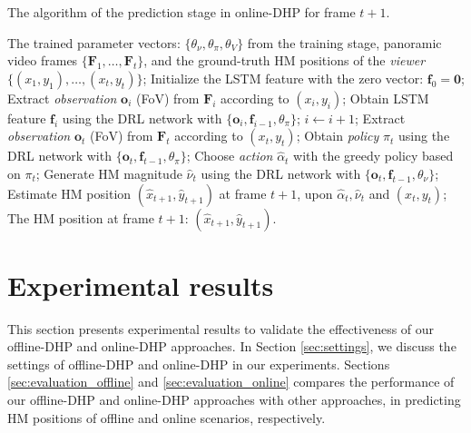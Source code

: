 \documentclass[10pt,journal,compsoc]{IEEEtran}
\begin{document}
\begin{algorithm}
   \caption{The algorithm of the prediction stage in online-DHP for frame $t+1$.}
   \label{online-DHP-algorithm-predicting}
   \footnotesize
\begin{algorithmic}
    The trained parameter vectors: $\{ \theta_{\nu}, \theta_{\pi}, \theta_{V} \}$ from the training stage, panoramic video frames $\{\mathbf{F}_1, \ldots, \mathbf{F}_t \}$, and the ground-truth HM positions of the \textit{viewer} $\{(x_{1},y_{1}),\ldots, (x_{t},y_{t})\}$;
   \STATE Initialize the LSTM feature with the zero vector: $\mathbf{f}_0=\mathbf{0}$;
       \STATE Extract \textit{observation} $\mathbf{o}_i$ (FoV) from $\mathbf{F}_i$ according to $(x_{i},y_{i})$;
       \STATE Obtain LSTM feature $\mathbf{f}_{i}$ using the DRL network with $\{\mathbf{o}_{i},\!\mathbf{f}_{i-1},\! \theta_{\pi}\}$;
       \STATE $i \leftarrow i+1$;
   \ENDFOR
   \STATE Extract \textit{observation} $\mathbf{o}_t$ (FoV) from $\mathbf{F}_t$ according to $(x_{t},y_{t})$;
   \STATE Obtain \textit{policy} $\pi_{t}$ using the DRL network with $\{\mathbf{o}_{t},\!\mathbf{f}_{t-1},\! \theta_{\pi}\}$;
   \STATE Choose \textit{action} $\hat{\alpha}_{t}$ with the greedy policy based on $\pi_{t}$;
   \STATE Generate HM magnitude $\hat{\nu}_{t}$ using the DRL network with $\{\mathbf{o}_{t}, \mathbf{f}_{t-1}, \theta_{\nu}\}$;
   \STATE Estimate HM position $(\!\hat{x}_{t+1}, \!\hat{y}_{t+1}\!)$ at frame $t+1$, upon $\hat{\alpha}_{t},\hat{\nu}_{t}$ and $(\!x_{t}, \!y_{t}\!)$;
    The HM position at frame $t+1$: $(\hat{x}_{t+1},\hat{y}_{t+1})$.
   \end{algorithmic}
\end{algorithm}


\section{Experimental results}
This section presents experimental results to validate the effectiveness of our offline-DHP and online-DHP approaches. In Section \ref{sec:settings}, we discuss the settings of offline-DHP and online-DHP in our experiments. Sections \ref{sec:evaluation_offline} and \ref{sec:evaluation_online} compares the performance of our offline-DHP and online-DHP approaches with other approaches, in predicting HM positions of offline and online scenarios, respectively.
\end{document}
